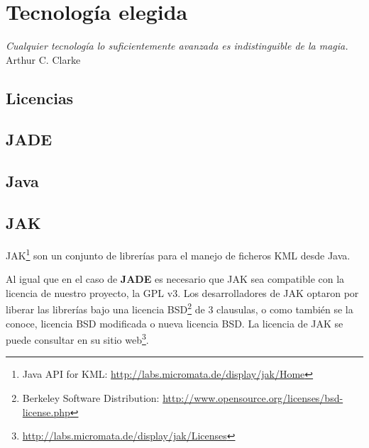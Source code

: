 
\chapter*{Tecnología elegida} \label{cap4}


\begin{flushright}
\begin{minipage}{7.85cm}
    {\em Cualquier tecnología lo suficientemente avanzada es indistinguible de
    la magia.} \\ Arthur C. Clarke
\end{minipage}
\end{flushright}

\vspace*{5mm}

\section*{Licencias}


\section*{JADE}

\section*{Java}

\section*{JAK}

JAK\footnote{Java API for KML: \url{http://labs.micromata.de/display/jak/Home}}
son un conjunto de librerías para el manejo de ficheros KML desde Java.


Al igual que en el caso de {\bf JADE} es necesario que JAK sea compatible con
la licencia de nuestro proyecto, la GPL v3. %
Los desarrolladores de JAK optaron por liberar las librerías bajo una licencia
BSD\footnote{Berkeley Software Distribution:
\url{http://www.opensource.org/licenses/bsd-license.php}} de 3 clausulas, o como
también se la conoce, licencia BSD modificada o nueva licencia BSD. La licencia
de JAK se puede consultar en su sitio
web\footnote{\url{http://labs.micromata.de/display/jak/Licenses}}.

